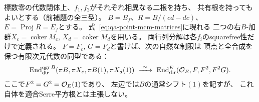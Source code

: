 \begin{lemma}
\label{lem:qa-pointed-abelianization-four-end}
標数零の代数閉体上、$f_1,f_2$がそれぞれ相異なる二根を持ち、
共有根を持ってもよいとする（前補題の全三型）。
$B=B_f$、$R=B/(cd-dc)$、$E=\operatorname{Proj}R=E_f$とする。
式~\eqref{eq:qa-point-mcm-matrices}に現れる
二つの右$B$-加群$X_c=\operatorname{coker}M_c$,
$X_d=\operatorname{coker}M_d$を用いる。
両行列分解は各$f_i$のsquarefree性だけで定義される。
$F=F_c$, $G=F_d$と書けば、次の自然な制限は
頂点と全合成を保つ有限次元代数の同型である：
\begin{equation}
\operatorname{End}_{\mathrm{dir}}^{\operatorname{qgr} B}
 (\pi B,\pi X_c,\pi B(1),\pi X_d(1))
 \ \xrightarrow{\ \sim\ }\
\operatorname{End}_{\mathrm{dir}}^{E}
 (\mathcal O_E,F,F^2,F^2G).
\label{eq:qa-pointed-four-end-abelianization}
\end{equation}
ここで$F^2=G^2=\mathcal O_E(1)$であり、
左辺では$B$の通常シフト$(1)$を記すが、
これ自体を適合Serre平方根とは主張しない。
\end{lemma}
